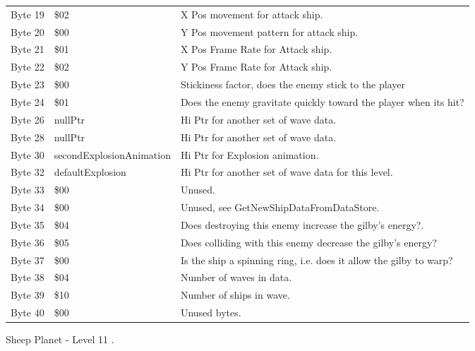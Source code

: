 \begin{figure}[H]
{\begin{adjustbox}{width=12cm}
\begin{tabular}{lll}
 Byte 19 & \$02                              & X Pos movement for attack ship.                                    \\
 Byte 20 & \$00                              & Y Pos movement pattern for attack ship.                            \\
 Byte 21 & \$01                              & X Pos Frame Rate for Attack ship.                                  \\
 Byte 22 & \$02                              & Y Pos Frame Rate for Attack ship.                                  \\
 Byte 23 & \$00                              & Stickiness factor, does the enemy stick to the player              \\
 Byte 24 & \$01                              & Does the enemy gravitate quickly toward the player when its hit?   \\
 Byte 26 & nullPtr                          & Hi Ptr for another set of wave data.                               \\
 Byte 28 & nullPtr                          & Hi Ptr for another set of wave data.                               \\
 Byte 30 & secondExplosionAnimation         & Hi Ptr for Explosion animation.                                    \\
 Byte 32 & defaultExplosion                 & Hi Ptr for another set of wave data for this level.                \\
 Byte 33 & \$00                              & Unused.                                                            \\
 Byte 34 & \$00                              & Unused, see GetNewShipDataFromDataStore.                           \\
 Byte 35 & \$04                              & Does destroying this enemy increase the gilby's energy?.           \\
 Byte 36 & \$05                              & Does colliding with this enemy decrease the gilby's energy?        \\
 Byte 37 & \$00                              & Is the ship a spinning ring, i.e. does it allow the gilby to warp? \\
 Byte 38 & \$04                              & Number of waves in data.                                           \\
 Byte 39 & \$10                              & Number of ships in wave.                                           \\
 Byte 40 & \$00                              & Unused bytes.                                                      \\
\bottomrule
\end{tabular}

  \end{adjustbox}

  }\caption*{Sheep Planet - Level 11
.}
\end{figure}

